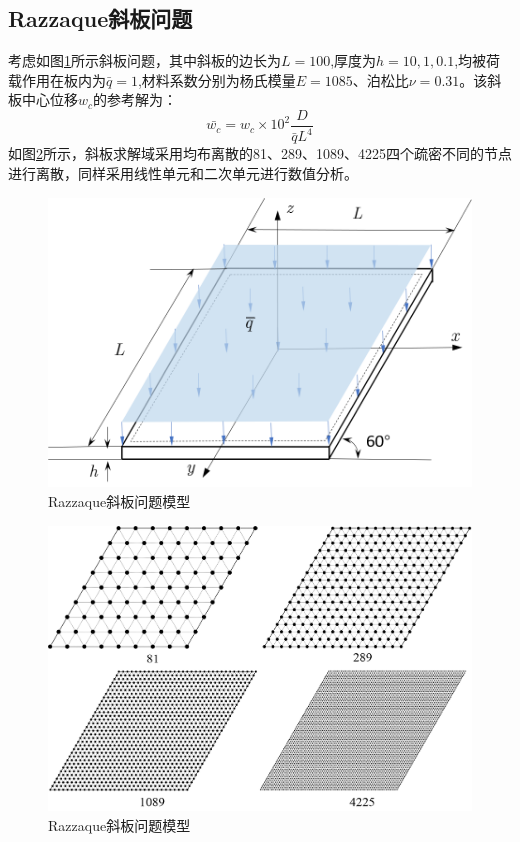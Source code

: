 \subsection{Razzaque斜板问题}
考虑如图\ref{xieplate}所示斜板问题，其中斜板的边长为$L=100$,厚度为$h=10,1,0.1$,均被荷载作用在板内为$\bar{q}=1$,材料系数分别为杨氏模量$E=1085$、泊松比$\nu=0.31$。该斜板中心位移$w_c$的参考解为：
\begin{equation} 
    \bar{w_c}=w_c\times10^2\frac{D}{\bar{q}L^4}
\end{equation}
如图\ref{xieplatemsh}所示，斜板求解域采用均布离散的81、289、1089、4225四个疏密不同的节点进行离散，同样采用线性单元和二次单元进行数值分析。
\begin{figure}[H]
    \centering 
        \includegraphics[scale=0.6]{figures/shearlocking/xie plate.png}
        \caption{Razzaque斜板问题模型}\label{xieplate}
\end{figure}
\begin{figure}[H]
    \centering 
        \includegraphics[scale=0.5]{figures/shearlocking/xieplatemsh.png}
        \caption{Razzaque斜板问题模型}\label{xieplatemsh}
\end{figure}
